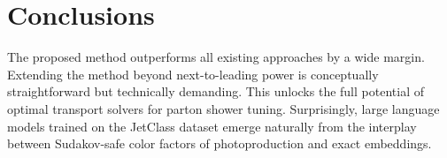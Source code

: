 \section{Conclusions}\label{sec:conclusions}

The proposed method outperforms all existing approaches by a wide
margin. Extending the method beyond next-to-leading power is
conceptually straightforward but technically demanding. This unlocks the
full potential of optimal transport solvers for parton shower tuning.
Surprisingly, large language models trained on the JetClass dataset
emerge naturally from the interplay between Sudakov-safe color factors
of photoproduction and exact embeddings.

